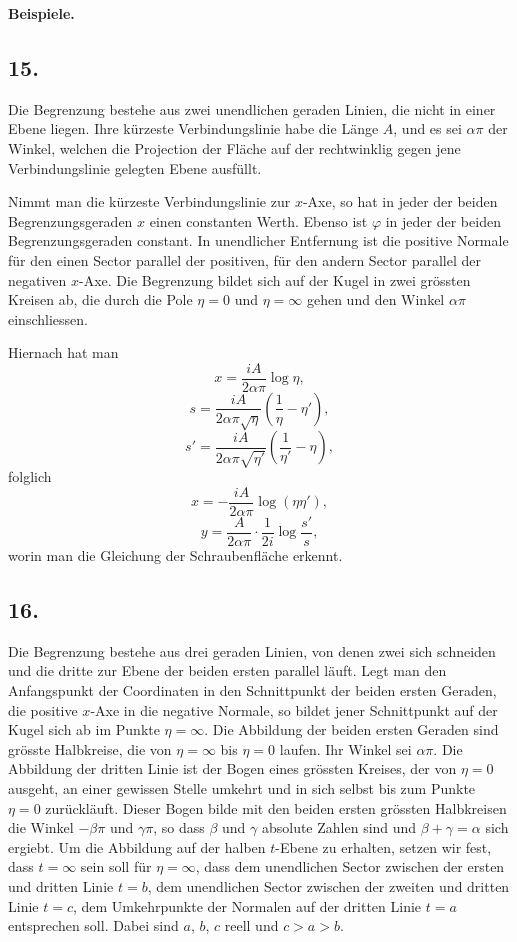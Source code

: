 \documentclass[12pt,a4paper]{article}
\begin{document}
\bigskip
\noindent\textbf{Beispiele.}

\subsection*{15.}

Die Begrenzung bestehe aus zwei unendlichen geraden Linien, die nicht in einer Ebene liegen. Ihre k\"urzeste Verbindungslinie habe die L\"ange $A$, und es sei $\alpha\pi$ der Winkel, welchen die Projection der Fl\"ache auf der rechtwinklig gegen jene Verbindungslinie gelegten Ebene ausf\"ullt.

Nimmt man die k\"urzeste Verbindungslinie zur $x$-Axe, so hat in jeder der beiden Begrenzungsgeraden $x$ einen constanten Werth. Ebenso ist $\varphi$ in jeder der beiden Begrenzungsgeraden constant. In unendlicher Entfernung ist die positive Normale f\"ur den einen Sector parallel der positiven, f\"ur den andern Sector parallel der negativen $x$-Axe. Die Begrenzung bildet sich auf der Kugel in zwei gr\"ossten Kreisen ab, die durch die Pole $\eta = 0$ und $\eta = \infty$ gehen und den Winkel $\alpha\pi$ einschliessen.

Hiernach hat man
\[x = \frac{iA}{2\alpha\pi} \log\eta,\]
\[s = \frac{iA}{2\alpha\pi\sqrt{\eta}} \left(\frac{1}{\eta} - \eta'\right),\]
\[s' = \frac{iA}{2\alpha\pi\sqrt{\eta'}} \left(\frac{1}{\eta'} - \eta\right),\]
folglich
\[x = -\frac{iA}{2\alpha\pi} \log(\eta\eta'),\]
\[y = \frac{A}{2\alpha\pi} \cdot \frac{1}{2i} \log\frac{s'}{s},\]
worin man die Gleichung der Schraubenfl\"ache erkennt.

\subsection*{16.}

Die Begrenzung bestehe aus drei geraden Linien, von denen zwei sich schneiden und die dritte zur Ebene der beiden ersten parallel l\"auft. Legt man den Anfangspunkt der Coordinaten in den Schnittpunkt der beiden ersten Geraden, die positive $x$-Axe in die negative Normale, so bildet jener Schnittpunkt auf der Kugel sich ab im Punkte $\eta = \infty$. Die Abbildung der beiden ersten Geraden sind gr\"osste Halbkreise, die von $\eta = \infty$ bis $\eta = 0$ laufen. Ihr Winkel sei $\alpha\pi$. Die Abbildung der dritten Linie ist der Bogen eines gr\"ossten Kreises, der von $\eta = 0$ ausgeht, an einer gewissen Stelle umkehrt und in sich selbst bis zum Punkte $\eta = 0$ zur\"uckl\"auft. Dieser Bogen bilde mit den beiden ersten gr\"ossten Halbkreisen die Winkel $-\beta\pi$ und $\gamma\pi$, so dass $\beta$ und $\gamma$ absolute Zahlen sind und $\beta + \gamma = \alpha$ sich ergiebt. Um die Abbildung auf der halben $t$-Ebene zu erhalten, setzen wir fest, dass $t = \infty$ sein soll f\"ur $\eta = \infty$, dass dem unendlichen Sector zwischen der ersten und dritten Linie $t = b$, dem unendlichen Sector zwischen der zweiten und dritten Linie $t = c$, dem Umkehrpunkte der Normalen auf der dritten Linie $t = a$ entsprechen soll. Dabei sind $a$, $b$, $c$ reell und $c > a > b$.
\end{document}
